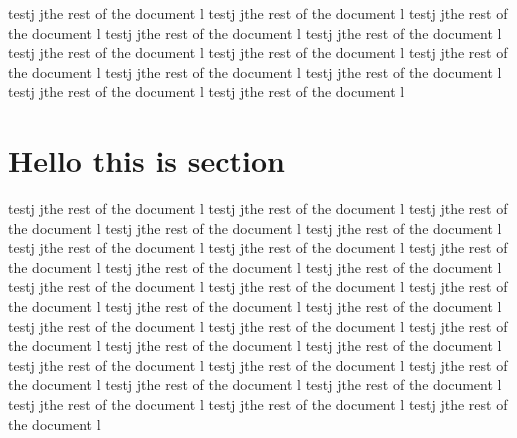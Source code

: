 \documentclass{article}
\begin{document}
\begin {abstract}

Hello test abstract , lets write any thinf lets go ok kpoerjple it si goiing ljto be awersjionmke mj
Hello test abstract , lets write any thinf lets go ok kpoerjple it si goiing ljto be awersjionmke mj
Hello test abstract , lets write any thinf lets go ok kpoerjple it si goiing ljto be awersjionmke mj
Hello test abstract , lets write any thinf lets go ok kpoerjple it si goiing ljto be awersjionmke mj

\end {abstract}

testj jthe rest of the document l
testj jthe rest of the document l
testj jthe rest of the document l
testj jthe rest of the document l
testj jthe rest of the document l
testj jthe rest of the document l
testj jthe rest of the document l
testj jthe rest of the document l
testj jthe rest of the document l
testj jthe rest of the document l
testj jthe rest of the document l
testj jthe rest of the document l


\section{Hello this is section }
testj jthe rest of the document l
testj jthe rest of the document l
testj jthe rest of the document l
testj jthe rest of the document l
testj jthe rest of the document l
testj jthe rest of the document l
testj jthe rest of the document l
testj jthe rest of the document l
testj jthe rest of the document l
testj jthe rest of the document l
testj jthe rest of the document l
testj jthe rest of the document l
testj jthe rest of the document l
testj jthe rest of the document l
testj jthe rest of the document l
testj jthe rest of the document l
testj jthe rest of the document l
testj jthe rest of the document l
testj jthe rest of the document l
testj jthe rest of the document l
testj jthe rest of the document l
testj jthe rest of the document l
testj jthe rest of the document l
testj jthe rest of the document l
testj jthe rest of the document l
testj jthe rest of the document l
testj jthe rest of the document l
testj jthe rest of the document l
\end{document}
